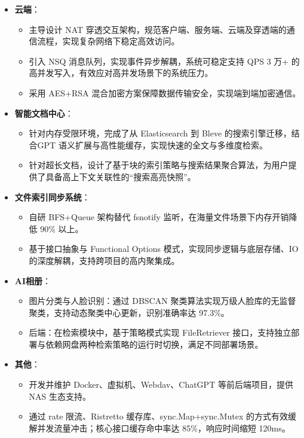 \documentclass{resume}
\begin{document}
\begin{itemize}

    \item \textbf{云端}：
    \begin{itemize}
        \item 主导设计 NAT 穿透交互架构，规范客户端、服务端、云端及穿透端的通信流程，实现复杂网络下稳定高效访问。
        \item 引入 NSQ 消息队列，实现事件异步解耦，系统可稳定支持 QPS 3 万+ 的高并发写入，有效应对高并发场景下的系统压力。
        \item 采用 AES+RSA 混合加密方案保障数据传输安全，实现端到端加密通信。
    \end{itemize}

    \item \textbf{智能文档中心}：
    \begin{itemize}
        \item 针对内存受限环境，完成了从 Elasticsearch 到 Bleve 的搜索引擎迁移，结合GPT 语义扩展与高性能缓存，实现快速的全文与多维度检索。
        \item 针对超长文档，设计了基于块的索引策略与搜索结果聚合算法，为用户提供了具备高上下文关联性的“搜索高亮快照”。
    \end{itemize}

    \item \textbf{文件索引同步系统}：
    \begin{itemize}
        \item 自研 BFS+Queue 架构替代 fsnotify 监听，在海量文件场景下内存开销降低 90\% 以上。
        \item 基于接口抽象与 Functional Options 模式，实现同步逻辑与底层存储、IO 的深度解耦，支持跨项目的高内聚集成。
    \end{itemize}

    \item \textbf{AI相册}：
    \begin{itemize}
        \item 图片分类与人脸识别：通过 DBSCAN 聚类算法实现万级人脸库的无监督聚类，支持动态聚类中心更新，识别准确率达 97.3\%。
        \item 后端：在检索模块中，基于策略模式实现 FileRetriever 接口，支持独立部署与依赖网盘两种检索策略的运行时切换，满足不同部署场景。
    \end{itemize}

    \item \textbf{其他}：
    \begin{itemize}
        \item 开发并维护 Docker、虚拟机、Webdav、ChatGPT 等前后端项目，提供 NAS 生态支持。
        \item 通过 rate 限流、Ristretto 缓存库、sync.Map+sync.Mutex 的方式有效缓解并发流量冲击；核心接口缓存命中率达 85\%，响应时间缩短 120ms。
    \end{itemize}

\end{itemize}
\end{document}

